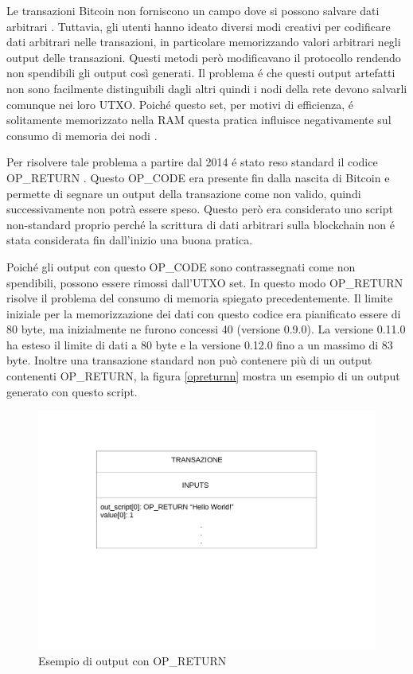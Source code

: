 Le transazioni Bitcoin non forniscono un campo dove si possono salvare dati arbitrari \cite{arbdata}. Tuttavia, gli utenti hanno ideato diversi modi creativi per codificare dati arbitrari nelle transazioni, in particolare memorizzando valori arbitrari negli output delle transazioni. Questi metodi però modificavano il protocollo rendendo non spendibili gli output così generati. Il problema é che questi output artefatti non sono facilmente distinguibili dagli altri quindi i nodi della rete devono salvarli comunque nei loro UTXO.
Poiché questo set, per motivi di efficienza, é solitamente memorizzato nella RAM \cite{utxo} questa pratica influisce negativamente sul consumo di memoria dei nodi \cite{stresstest}.

Per risolvere tale problema a partire dal 2014 é stato reso standard il codice OP\_RETURN \cite{opreturnstandard}. Questo OP\_CODE era presente fin dalla nascita di Bitcoin e permette di segnare un output della transazione come non valido, quindi successivamente non potrà essere speso. Questo però era considerato uno script non-standard proprio perché la scrittura di dati arbitrari sulla blockchain non é stata considerata fin dall'inizio una buona pratica.

Poiché gli output con questo OP\_CODE sono contrassegnati come non spendibili, possono essere rimossi dall'UTXO set. In questo modo OP\_RETURN risolve il problema del consumo di memoria spiegato precedentemente. Il limite iniziale per la memorizzazione dei dati con questo codice era pianificato essere di 80 byte, ma inizialmente ne furono concessi 40 (versione 0.9.0).  La versione 0.11.0 \cite{v11} ha esteso il limite di dati a 80 byte e la versione 0.12.0 \cite{v12} fino a un massimo di 83 byte. Inoltre una transazione standard non può contenere più di un output contenenti OP\_RETURN, la figura \ref{opreturnn} mostra un esempio di un output generato con questo script.
\begin{figure}[h!]
    \centering
    \includegraphics[scale=0.5, trim = 1cm 8cm 0cm 3cm, clip]{Images/opreturnn.pdf}
    \caption{Esempio di output con OP\_RETURN}
    \label{fig:opreturnn}
\end{figure}
\FloatBarrier

